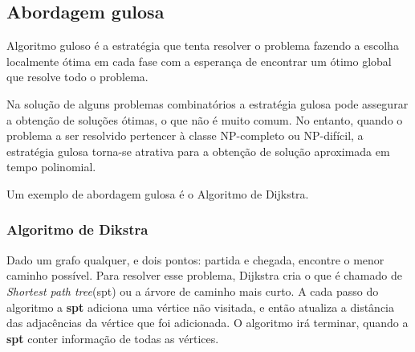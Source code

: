 \subsection{Abordagem gulosa}

    Algoritmo guloso é a estratégia que tenta resolver o problema fazendo a 
    escolha localmente ótima em cada fase com a esperança de encontrar 
    um ótimo global que resolve todo o problema. 

    Na solução de alguns problemas combinatórios a estratégia gulosa pode
    assegurar a obtenção de soluções ótimas, o que não é muito comum. No
    entanto, quando o problema a ser resolvido pertencer à classe NP-completo
    ou NP-difícil, a estratégia gulosa torna-se atrativa para a obtenção de
    solução aproximada em tempo polinomial.

    Um exemplo de abordagem gulosa é o Algoritmo de Dijkstra.

\subsubsection{Algoritmo de Dikstra}

    Dado um grafo qualquer, e dois pontos: partida e chegada, encontre o menor caminho possível.
    Para resolver esse problema, Dijkstra cria o que é chamado de \emph{Shortest path tree}(spt) ou 
    a árvore de caminho mais curto. A cada passo do algoritmo a \textbf{spt} adiciona uma vértice não visitada,
    e então atualiza a distância das adjacências da vértice que foi adicionada. O algoritmo irá terminar, quando 
    a \textbf{spt} conter informação de todas as vértices.